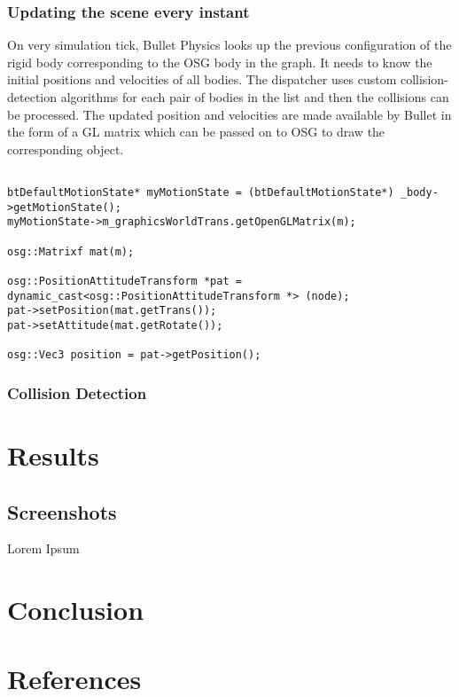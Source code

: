 \documentclass[a4paper]{article}
\begin{document}
\subsubsection{\color{db}Updating the scene every instant}
On very simulation tick, Bullet Physics looks up the previous configuration of the rigid body corresponding to the OSG body in the graph. It needs to know the initial positions and velocities of all bodies. The dispatcher uses custom collision-detection algorithms for each pair of bodies in the list and then the collisions can be processed. The updated position and velocities are made available by Bullet in the form of a GL matrix which can be passed on to OSG to draw the corresponding object.
\begin{lstlisting}

btDefaultMotionState* myMotionState = (btDefaultMotionState*) _body->getMotionState();
myMotionState->m_graphicsWorldTrans.getOpenGLMatrix(m);

osg::Matrixf mat(m);

osg::PositionAttitudeTransform *pat = dynamic_cast<osg::PositionAttitudeTransform *> (node);
pat->setPosition(mat.getTrans());
pat->setAttitude(mat.getRotate());

osg::Vec3 position = pat->getPosition();

\end{lstlisting}

\subsubsection{\color{db}Collision Detection}





\section{\color{db}Results}
\subsection{\color{db}Screenshots}
Lorem Ipsum


\section{\color{db}Conclusion}
\section{\color{db}References}
\end{document}
